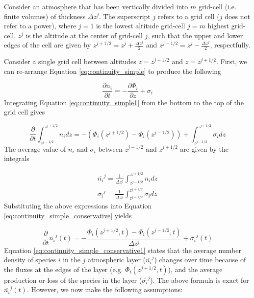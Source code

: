 \documentclass{article}
\begin{document}
Consider an atmosphere that has been vertically divided into $m$ grid-cell (i.e. finite volumes) of thickness $\Delta z^j$. The superscript $j$ refers to a grid cell ($j$ does not refer to a power), where $j = 1$ is the lowest altitude grid-cell $j = m$ highest grid-cell. $z^j$ is the altitude at the center of grid-cell $j$, such that the upper and lower edges of the cell are given by $z^{j+1/2} = z^j + \frac{\Delta z^j}{2}$ and $z^{j-1/2} = z^j - \frac{\Delta z^j}{2}$, respectfully.

Consider a single grid cell between altitudes $z = z^{j-1/2}$ and $z = z^{j+1/2}$. First, we can re-arrange Equation \eqref{eq:continuity_simple} to produce the following

\begin{equation} \label{eq:continuity_simple1}
  \frac{\partial n_i}{\partial t} = - \frac{\partial \Phi_{i}}{\partial z} + \sigma_i
\end{equation}
Integrating Equation \eqref{eq:continuity_simple1} from the bottom to the top of the grid cell gives

\begin{equation} \label{eq:continuity_simple_conservative}
  \frac{\partial}{\partial t} \int_{z^{j-1/2}}^{z^{j+1/2}} n_i dz = - (\Phi_{i}(z^{j+1/2}) - \Phi_{i}(z^{j-1/2})) + \int_{z^{j-1/2}}^{z^{j+1/2}} \sigma_i dz
\end{equation}
The average value of $n_i$ and $\sigma_i$ between $z^{j-1/2}$ and $z^{j+1/2}$ are given by the integrals

\begin{align}
  \overline{n_i}^j = \frac{1}{\Delta z^j} \int_{z^{j-1/2}}^{z^{j+1/2}} n_i dz \\
  \overline{\sigma_i}^j = \frac{1}{\Delta z^j} \int_{z^{j-1/2}}^{z^{j+1/2}} \sigma_i dz
\end{align}
Substituting the above expressions into Equation \eqref{eq:continuity_simple_conservative} yields

\begin{equation} \label{eq:continuity_simple_conservative1}
  \frac{\partial}{\partial t} \overline{n_i}^j(t) = - \frac{\Phi_{i}(z^{j+1/2},t) - \Phi_{i}(z^{j-1/2},t)}{\Delta z^j} + \overline{\sigma_i}^j(t)
\end{equation}
Equation \eqref{eq:continuity_simple_conservative1} states that the average number density of species $i$ in the $j$ atmospheric layer ($\overline{n_i}^j$) changes over time because of the fluxes at the edges of the layer (e.g. $\Phi_{i}(z^{j+1/2},t)$), and the average production or loss of the species in the layer ($\overline{\sigma_i}^j$). The above formula is exact for $\overline{n_i}^j(t)$. However, we now make the following assumptions:
\end{document}
